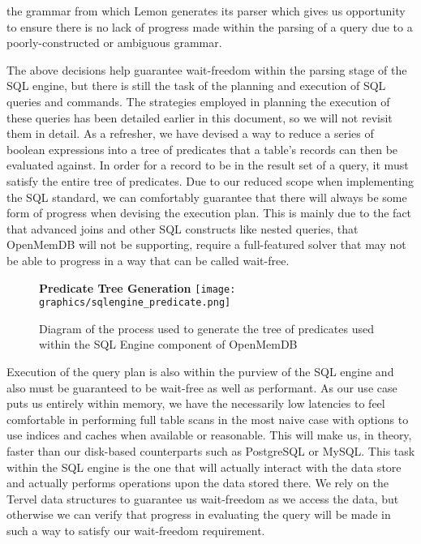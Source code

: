 \documentclass[letterpaper, 12pt]{article}
\begin{document}
  the grammar from which Lemon generates its parser which gives us opportunity to ensure there
  is no lack of progress made within the parsing of a query due to a poorly-constructed or ambiguous
  grammar.
  \par\vspace{\baselineskip}
  The above decisions help guarantee wait-freedom within the parsing stage of the SQL engine, but there
  is still the task of the planning and execution of SQL queries and commands. The strategies employed in
  planning the execution of these queries has been detailed earlier in this document, so we will not 
  revisit them in detail. As a refresher, we have devised a way to reduce a series of boolean expressions
  into a tree of predicates that a table's records can then be evaluated against. In order for a record
  to be in the result set of a query, it must satisfy the entire tree of predicates. Due to our reduced scope
  when implementing the SQL standard, we can comfortably guarantee that there will always be some form 
  of progress when devising the execution plan. This is mainly due to the fact that advanced joins and 
  other SQL constructs like nested queries, that OpenMemDB will not be supporting, require a full-featured 
  solver that may not be able to progress in a way that can be called wait-free.
  \par\vspace{\baselineskip}
  \begin{figure}
   \centering
   \textbf{Predicate Tree Generation}
   \texttt{[image: graphics/sqlengine\_predicate.png]}
   \caption{Diagram of the process used to generate the tree of predicates
	    used within the SQL Engine component of OpenMemDB}
  \end{figure}
  \par\vspace{\baselineskip}
  Execution of the query plan is also within the purview of the SQL engine and also must be guaranteed to be
  wait-free as well as performant. As our use case puts us entirely within memory, we have the necessarily low
  latencies to feel comfortable in performing full table scans in the most naive case with options to 
  use indices and caches when available or reasonable. This will make us, in theory, faster than our disk-based
  counterparts such as PostgreSQL or MySQL. This task within the SQL engine is the one that will actually
  interact with the data store and actually performs operations upon the data stored there. We rely on the Tervel
  data structures to guarantee us wait-freedom as we access the data, but otherwise we can verify that
  progress in evaluating the query will be made in such a way to satisfy our wait-freedom requirement.
  \par\vspace{\baselineskip}
  
\end{document}
